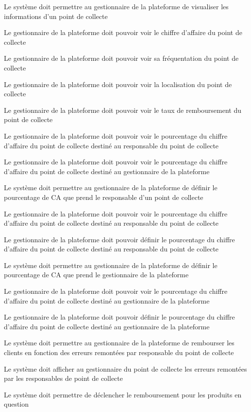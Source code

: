\begin{reqf}{Le système doit permettre au gestionnaire de la plateforme de visualiser les informations d'un point de collecte}
\item Le gestionnaire de la plateforme doit pouvoir voir le chiffre d'affaire du point de collecte
\item Le gestionnaire de la plateforme doit pouvoir voir sa fréquentation du point de collecte
\item Le gestionnaire de la plateforme doit pouvoir voir la localisation du point de collecte
\item Le gestionnaire de la plateforme doit pouvoir voir le taux de remboursement du point de collecte
\item Le gestionnaire de la plateforme doit pouvoir voir le pourcentage du chiffre d'affaire du point de collecte destiné au responsable du point de collecte
\item Le gestionnaire de la plateforme doit pouvoir voir le pourcentage du chiffre d'affaire du point de collecte destiné au gestionnaire de la plateforme
\end{reqf}

\begin{reqf}{Le système doit permettre au gestionnaire de la plateforme de définir le pourcentage de CA que prend le responsable d'un point de collecte}
\item Le gestionnaire de la plateforme doit pouvoir voir le pourcentage du chiffre d'affaire du point de collecte destiné au responsable du point de collecte
\item Le gestionnaire de la plateforme doit pouvoir définir le pourcentage du chiffre d'affaire du point de collecte destiné au responsable du point de collecte
\end{reqf}

\begin{reqf}{Le système doit permettre au gestionnaire de la plateforme de définir le pourcentage de CA que prend le gestionnaire de la plateforme}
\item Le gestionnaire de la plateforme doit pouvoir voir le pourcentage du chiffre d'affaire du point de collecte destiné au gestionnaire de la plateforme
\item Le gestionnaire de la plateforme doit pouvoir définir le pourcentage du chiffre d'affaire du point de collecte destiné au gestionnaire de la plateforme
\end{reqf}

\begin{reqf}{Le système doit permettre au gestionnaire de la plateforme de rembourser les clients en fonction des erreurs remontées par responsable du point de collecte}
\item Le système doit afficher au gestionnaire du point de collecte les erreurs remontées par les responsables de point de collecte
\item Le système doit permettre de déclencher le remboursement pour les produits en question
\end{reqf}

